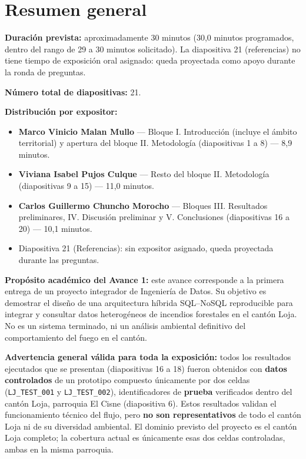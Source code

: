\documentclass[11pt,a4paper]{article}
\begin{document}
\tableofcontents
\newpage

\section{Resumen general}

\textbf{Duraci\'on prevista:} aproximadamente 30 minutos (30,0 minutos
programados, dentro del rango de 29 a 30 minutos solicitado). La
diapositiva 21 (referencias) no tiene tiempo de exposici\'on oral
asignado: queda proyectada como apoyo durante la ronda de preguntas.

\textbf{N\'umero total de diapositivas:} 21.

\textbf{Distribuci\'on por expositor:}
\begin{itemize}[itemsep=2pt]
  \item \textbf{Marco Vinicio Malan Mullo} --- Bloque I. Introducci\'on
    (incluye el \'ambito territorial) y apertura del bloque II.
    Metodolog\'ia (diapositivas 1 a 8) --- 8,9 minutos.
  \item \textbf{Viviana Isabel Pujos Culque} --- Resto del bloque II.
    Metodolog\'ia (diapositivas 9 a 15) --- 11,0 minutos.
  \item \textbf{Carlos Guillermo Chuncho Morocho} --- Bloques III.
    Resultados preliminares, IV. Discusi\'on preliminar y V.
    Conclusiones (diapositivas 16 a 20) --- 10,1 minutos.
  \item Diapositiva 21 (Referencias): sin expositor asignado, queda
    proyectada durante las preguntas.
\end{itemize}

\textbf{Prop\'osito acad\'emico del Avance 1:} este avance corresponde
a la primera entrega de un proyecto integrador de Ingenier\'ia de
Datos. Su objetivo es demostrar el dise\~no de una arquitectura
h\'ibrida SQL--NoSQL reproducible para integrar y consultar datos
heterog\'eneos de incendios forestales en el cant\'on Loja. No es un
sistema terminado, ni un an\'alisis ambiental definitivo del
comportamiento del fuego en el cant\'on.

\begin{framed}
\noindent\textbf{Advertencia general v\'alida para toda la
exposici\'on:} todos los resultados ejecutados que se presentan
(diapositivas 16 a 18) fueron obtenidos con \textbf{datos controlados}
de un prototipo compuesto \'unicamente por dos celdas
(\texttt{LJ\_TEST\_001} y \texttt{LJ\_TEST\_002}), identificadores de
\textbf{prueba} verificados dentro del cant\'on Loja, parroquia El
Cisne (diapositiva 6). Estos resultados validan el funcionamiento
t\'ecnico del flujo, pero \textbf{no son representativos} de todo el
cant\'on Loja ni de su diversidad ambiental. El dominio previsto del
proyecto es el cant\'on Loja completo; la cobertura actual es
\'unicamente esas dos celdas controladas, ambas en la misma parroquia.
\end{framed}
\end{document}
